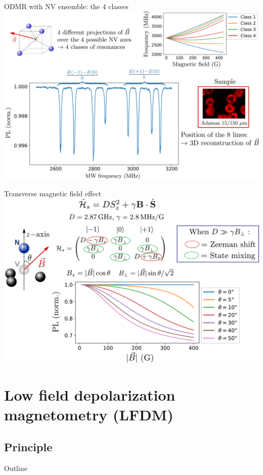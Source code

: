 \documentclass{beamer}
\begin{document}
\begin{frame}{ODMR with NV ensemble: the 4 classes}
\centering
\includegraphics[width=\textwidth,height=0.85\textheight,keepaspectratio]{Slide_ODMR_8_classes}
\end{frame}

\begin{frame}{Transverse magnetic field effect}
\centering
\includegraphics[width=\textwidth,height=0.85\textheight,keepaspectratio]{Slide_champs_transverse}
\end{frame}



\section{Low field depolarization magnetometry (LFDM)}
\subsection{Principle}
\begin{frame}{Outline}
\tableofcontents[currentsection]
\end{frame}
\end{document}
